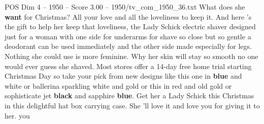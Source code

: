 \begin{textsample}{POS Dim 4 – 1950 – Score 3.00 – 1950/tv\_com\_1950\_36.txt}  \label{ex:f4_pos_087}
What does she \textbf{want} for Christmas?
All your love and all the loveliness to keep it.
And here 's the gift to help her keep that loveliness, the Lady Schick electric shaver designed just for a woman with one side for underarms for shave so close but so gentle a deodorant can be used immediately and the other side made especially for legs.
Nothing she could use is more feminine.
Why her skin will stay so smooth no one would ever guess she shaved.
Most stores offer a 14-day free home trial starting Christmas Day so take your pick from new designs like this one in \textbf{blue} and white or ballerina sparkling white and gold or this in red and old gold or sophisticate jet \textbf{black} and sapphire \textbf{blue}.
Get her a Lady Schick this Christmas in this delightful hat box carrying case.
She 'll love it and love you for giving it to her. you

\end{textsample}

